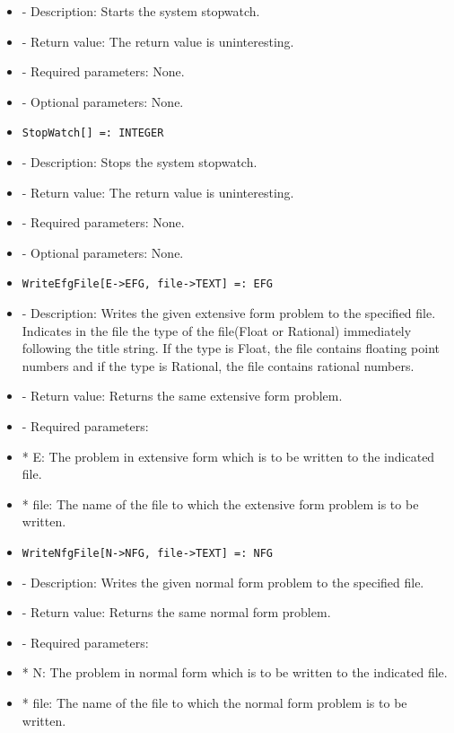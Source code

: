 \begin{itemize}
\bd
\item
- Description:  Starts the system stopwatch.  
\item
- Return value:  The return value is uninteresting.
\item
- Required parameters:  None.
\item
- Optional parameters:  None.
\ed

\item
\begin{verbatim}
StopWatch[] =: INTEGER
\end{verbatim}

\bd
\item
- Description:  Stops the system stopwatch.  
\item
- Return value:  The return value is uninteresting.
\item
- Required parameters:  None.
\item
- Optional parameters:  None.
\ed

\item

\begin{verbatim}
WriteEfgFile[E->EFG, file->TEXT] =: EFG
\end{verbatim}

\bd
\item
- Description:  Writes the given extensive form problem to the specified 
file.  Indicates in the file the type of the file(Float or Rational) 
immediately following the title string.  If the type is Float, the file
contains floating point numbers and if the type is Rational, the file
contains rational numbers.  
\item
- Return value:  Returns the same extensive form problem.
\item
- Required parameters:

\bd
\item
*  E:  The problem in extensive form which is to be written to the
indicated file.
\item
*  file:  The name of the file to which the extensive form problem is
to be written.
\ed
\ed

\item

\begin{verbatim}
WriteNfgFile[N->NFG, file->TEXT] =: NFG
\end{verbatim}

\bd
\item
- Description:  Writes the given normal form problem to the specified 
file.  
\item
- Return value:  Returns the same normal form problem.
\item
- Required parameters:

\bd
\item
*  N:  The problem in normal form which is to be written to the
indicated file.

\item
*  file:  The name of the file to which the normal form problem is
to be written.
\ed
\ed
\end{itemize}
